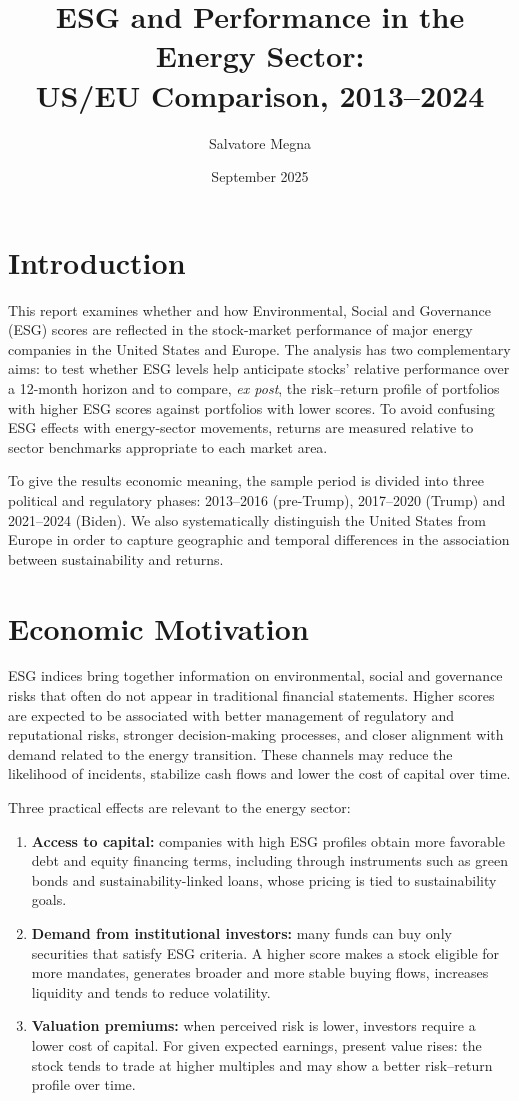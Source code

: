 \documentclass[12pt,a4paper]{article}
\title{\textbf{ESG and Performance in the Energy Sector:\\US/EU Comparison, 2013--2024}}
\author{Salvatore Megna}
\date{September 2025}
\begin{document}
\maketitle

\section{Introduction}

This report examines whether and how Environmental, Social and Governance (ESG) scores are reflected in the stock-market performance of major energy companies in the United States and Europe. The analysis has two complementary aims: to test whether ESG levels help anticipate stocks' relative performance over a 12-month horizon and to compare, \textit{ex post}, the risk--return profile of portfolios with higher ESG scores against portfolios with lower scores. To avoid confusing ESG effects with energy-sector movements, returns are measured relative to sector benchmarks appropriate to each market area.

To give the results economic meaning, the sample period is divided into three political and regulatory phases: 2013--2016 (pre-Trump), 2017--2020 (Trump) and 2021--2024 (Biden). We also systematically distinguish the United States from Europe in order to capture geographic and temporal differences in the association between sustainability and returns.

\section{Economic Motivation}

ESG indices bring together information on environmental, social and governance risks that often do not appear in traditional financial statements. Higher scores are expected to be associated with better management of regulatory and reputational risks, stronger decision-making processes, and closer alignment with demand related to the energy transition. These channels may reduce the likelihood of incidents, stabilize cash flows and lower the cost of capital over time.

Three practical effects are relevant to the energy sector:

\begin{enumerate}
\item \textbf{Access to capital:} companies with high ESG profiles obtain more favorable debt and equity financing terms, including through instruments such as green bonds and sustainability-linked loans, whose pricing is tied to sustainability goals.
\item \textbf{Demand from institutional investors:} many funds can buy only securities that satisfy ESG criteria. A higher score makes a stock eligible for more mandates, generates broader and more stable buying flows, increases liquidity and tends to reduce volatility.
\item \textbf{Valuation premiums:} when perceived risk is lower, investors require a lower cost of capital. For given expected earnings, present value rises: the stock tends to trade at higher multiples and may show a better risk--return profile over time.
\end{enumerate}
\end{document}
